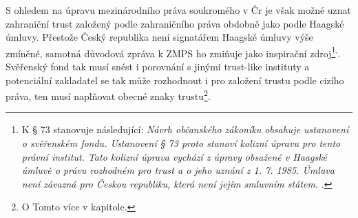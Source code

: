 \documentclass{article}
\begin{document}
S ohledem na úpravu mezinárodního práva soukromého v Čr je však možné uznat zahraniční trust založený podle zahraničního práva obdobně jako podle Haagské úmluvy. Přestože Český republika není signatářem Haagské úmluvy výše zmíněné, samotná důvodová zpráva k ZMPS ho zmiňuje jako inspirační zdroj\footnote{K § 73 stanovuje následující: \textit{Návrh občanského zákoníku obsahuje ustanovení o svěřenském fondu. Ustanovení § 73 proto stanoví kolizní úpravu pro tento právní institut. Tato kolizní úprava vychází z úpravy obsažené v Haagské úmluvě o právu rozhodném pro trust a o jeho uznání z 1. 7. 1985. Úmluva není závazná pro Českou republiku, která není jejím smluvním státem. }.}\textsuperscript{,}. Svěřenský fond tak musí snést i porovnání s jinými trust-like instituty a potenciální zakladatel se tak může rozhodnout i pro založení trustu podle cizího práva, ten musí naplňovat obecné znaky trustu\footnote{O Tomto více v kapitole.}.\\



\end{document}
